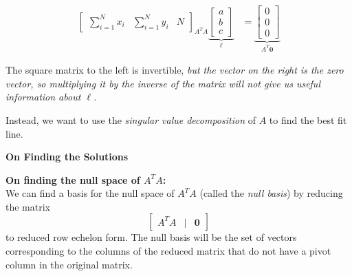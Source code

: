 \begin{problem}
\begin{enumroman}
\begin{answer}
\begin{align*}
{\begin{bmatrix}
            \sum\limits_{i=1}^N x_i & \sum\limits_{i=1}^N y_i & N
          \end{bmatrix}}_{A^T A}
          \underbrace{\begin{bmatrix}
            a \\
            b \\
            c
          \end{bmatrix}}_{\ell}
          &=
          \underbrace{\begin{bmatrix}
            0 \\
            0 \\
            0
          \end{bmatrix}}_{A^T \mathbf{0}}
        \end{align*}

        The square matrix to the left is invertible,
        \emph{
          but the vector on the right is the zero vector,
          so multiplying it by the inverse of the matrix
          will not give us useful information about $\ell$.
        }

        Instead, we want to use the \emph{singular value decomposition} of $A$ to find
        the best fit line.

        \step
        \textbf{On Finding the Solutions}


        \textbf{On finding the null space of $A^TA$:} \\
        We can find a basis for the null space of $A^TA$
        (called the \emph{null basis}) by reducing the matrix
        \[ \begin{bmatrix}
          A^TA & | & \mathbf{0}
        \end{bmatrix}
        \] to reduced row echelon form.
        The null basis will be the set of vectors corresponding
        to the columns of the reduced matrix that do not have
        a pivot column in the original matrix.


\end{answer}
\end{enumroman}
\end{problem}
